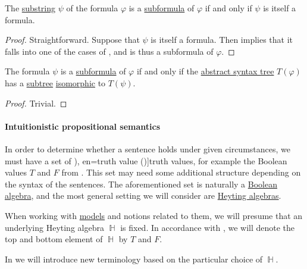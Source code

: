 \begin{proposition}\label{thm:propositional_formula_characterization}
  The \hyperref[def:formal_language/substring]{substring} \( \psi \) of the formula \( \varphi \) is a \hyperref[def:propositional_subformula]{subformula} of \( \varphi \) if and only if \( \psi \) is itself a formula.
\end{proposition}
\begin{proof}
  \SufficiencySubProof Straightforward.
  \NecessitySubProof Suppose that \( \psi \) is itself a formula. Then  implies that it falls into one of the cases of , and is thus a subformula of \( \varphi \).
\end{proof}

\begin{proposition}\label{thm:propositional_ast_subformula}
  The formula \( \psi \) is a \hyperref[def:propositional_subformula]{subformula} of \( \varphi \) if and only if the \hyperref[def:propositional_formula_ast]{abstract syntax tree} \( T(\varphi) \) has a \hyperref[def:tree/subtree]{subtree} \hyperref[def:labeled_tree/homomorphism]{isomorphic} to \( T(\psi) \).
\end{proposition}
\begin{proof}
  Trivial.
\end{proof}

\paragraph{Intuitionistic propositional semantics}

\begin{definition}\label{con:truth_value_algebra}\mimprovised
  In order to determine whether a sentence holds under given circumstances, we must have a set of \term[ru=истинностное значение (\cite[17]{Герасимов2011Вычислимость}), en=truth value (\cite[9]{Smullyan1995FOL})]{truth values}, for example the Boolean values \( T \) and \( F \) from . This set may need some additional structure depending on the syntax of the sentences. The aforementioned set is naturally a \hyperref[def:boolean_algebra]{Boolean algebra}, and the most general setting we will consider are \hyperref[def:heyting_algebra]{Heyting algebras}.

  When working with \hyperref[def:institution/models]{models} and notions related to them, we will presume that an underlying Heyting algebra \( \BbbH \) is fixed. In accordance with , we will denote the top and bottom element of \( \BbbH \) by \( T \) and \( F \).
\end{definition}
\begin{comments}
  \item In  we will introduce new terminology based on the particular choice of \( \BbbH \).
\end{comments}

